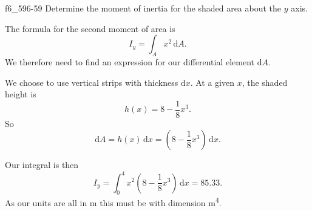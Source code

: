 \begin{problemwithimage}{f6_59}{6-59}
  Determine the moment of inertia for the shaded area about the $y$ axis.
\end{problemwithimage}

\begin{derivation}
  The formula for the second moment of area is
  \begin{equation*}
    I_y = \int_A x^2 \, \mathrm{d}A
  .\end{equation*}
  We therefore need to find an expression for our differential element $\mathrm{d}A$.

  We choose to use vertical strips with thickness $\mathrm{d}x$.
  At a given $x$, the shaded height is
  \begin{equation*}
    h(x) = 8 - \frac{1}{8}x^3
  .\end{equation*}
  So
  \begin{equation*}
    \mathrm{d}A = h(x) \, \mathrm{d}x = \left( 8 - \frac{1}{8} x^3 \right) \, \mathrm{d}x
  .\end{equation*}
  
  Our integral is then
  \begin{equation*}
    I_y = \int_{0}^{4} x^2 \left( 8 - \frac{1}{8} x^3 \right) \, \mathrm{d}x  = \num{85,33} 
  .\end{equation*}
  As our units are all in \unit{\m} this must be with dimension \unit{\m^4}.
\end{derivation}

